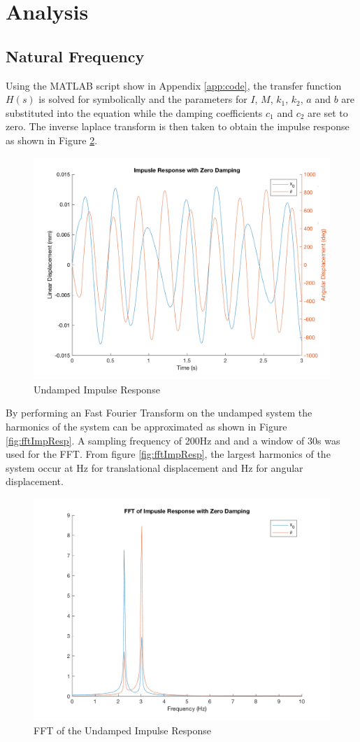 \documentclass[12pt]{article}
\begin{document}
\section{Analysis}
\subsection{Natural Frequency}
Using the MATLAB script show in Appendix \ref{app:code}, the transfer function $H(s)$ is solved for symbolically and the parameters for $I$, $M$, $k_1$, $k_2$, $a$ and $b$ are substituted into the equation while the damping coefficients $c_1$ and $c_2$ are set to zero. The inverse laplace transform is then taken to obtain the impulse response as shown in Figure \ref{fig:impResp}.
\begin{figure}[h!]
	\centering
	\label{fig:impResp}
	\includegraphics[width=.8\textwidth]{./matlab/impResp.png}
	\caption{Undamped Impulse Response}
\end{figure}

By performing an Fast Fourier Transform on the undamped system the harmonics of the system can be approximated as shown in Figure \ref{fig:fftImpResp}. A sampling frequency of 200Hz and and a window of 30s was used for the FFT.
From figure \ref{fig:fftImpResp}, the largest harmonics of the system occur at Hz for translational displacement and Hz for angular displacement. 
\begin{figure}[h!]
	\centering
	\label{fig:impResp}
	\includegraphics[width=.8\textwidth]{./matlab/fftImpResp.png}
	\caption{FFT of the Undamped Impulse Response}
\end{figure}
\end{document}
